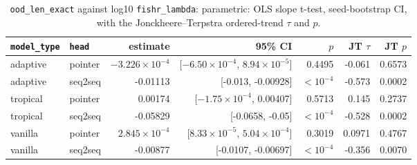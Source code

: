 \documentclass[10pt]{article}
\begin{document}
{\small
\begin{longtable}{llrrrrr}
\caption{\texttt{ood\_len\_exact} against log10 \texttt{fishr\_lambda}: parametric: OLS slope t-test, seed-bootstrap CI, with the Jonckheere--Terpstra ordered-trend $\tau$ and $p$.}\label{tab:trend-ood_len_exact}\\
\toprule
\texttt{model\_type} & \texttt{head} & estimate & 95\% CI & $p$ & JT $\tau$ & JT $p$\\
\midrule
\endhead
adaptive & pointer & $-3.226\times10^{-4}$ & [$-6.50\times10^{-4}$, $8.94\times10^{-5}$] & 0.4495 & -0.061 & 0.6573\\
adaptive & seq2seq & -0.01113 & [-0.013, -0.00928] & $<10^{-4}$ & -0.573 & 0.0002\\
tropical & pointer & 0.00174 & [$-1.75\times10^{-4}$, 0.00407] & 0.5713 & 0.145 & 0.2737\\
tropical & seq2seq & -0.05829 & [-0.0658, -0.05] & $<10^{-4}$ & -0.528 & 0.0002\\
vanilla & pointer & $2.845\times10^{-4}$ & [$8.33\times10^{-5}$, $5.04\times10^{-4}$] & 0.3019 & 0.0971 & 0.4767\\
vanilla & seq2seq & -0.00877 & [-0.0107, -0.00697] & $<10^{-4}$ & -0.356 & 0.0070\\
\bottomrule
\end{longtable}
}
\end{document}
